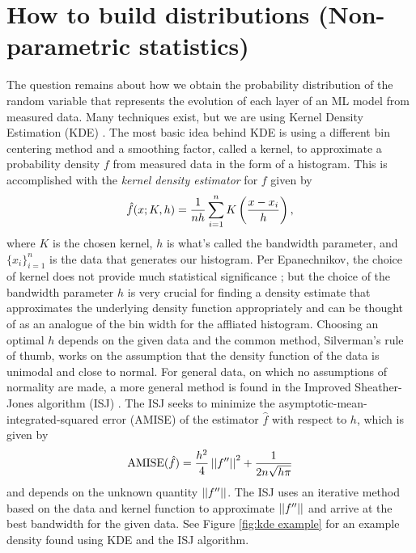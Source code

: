 \section{How to build distributions (Non-parametric statistics)}
The question remains about how we obtain the probability distribution of the random 
variable that represents the evolution of each layer of an ML model from measured data. 
Many techniques exist, but we are using Kernel Density Estimation (KDE) \cite{rosenblatt, parzen}. 
The most 
basic idea behind KDE is using a different bin centering method and a smoothing factor, 
called a kernel, to approximate a probability density $f$ from measured data in the form 
of a histogram. This is accomplished with the \emph{kernel density estimator} for $f$
given by
\begin{equation}
    \hat{f}(x; K, h) = \frac{1}{nh}\sum_{i = 1}^n K\left(\frac{x - x_i}{h}\right),
\end{equation}
where $K$ is the chosen kernel, $h$ is what's called the bandwidth parameter, and 
$\{x_i\}_{i=1}^n$ is the data that generates our histogram. Per Epanechnikov, 
the choice of kernel does not provide much statistical significance \cite{epanechnikov}; 
but the choice of the bandwidth parameter $h$ is very crucial for finding a density estimate
that approximates the underlying density function appropriately and can be thought of as an 
analogue of the bin width for the affliated histogram. Choosing an optimal $h$ depends on 
the given data and the common method, Silverman's rule of thumb, works on the 
assumption that the density function of the data is unimodal and close to 
normal. For general data, on which no assumptions of normality are made, a more 
general method is found in the Improved Sheather-Jones algorithm (ISJ) \cite{botev}. 
The ISJ seeks to minimize the asymptotic-mean-integrated-squared error (AMISE) of 
the estimator $\hat{f}$ with respect to $h$, which is given by 
\begin{equation}
    \text{AMISE}(\hat{f}) = \frac{h^2}{4}\left|\left|f''\right|\right|^2 + \frac{1}{2n\sqrt{h\pi}}
\end{equation}
and depends on the unknown quantity $\left|\left|f''\right|\right|$. The ISJ uses an iterative method 
based on the data and kernel function to approximate $\left|\left|f''\right|\right|$ and arrive at 
the best bandwidth for the given data. See Figure \ref{fig:kde example} for an example 
density found using KDE and the ISJ algorithm.

